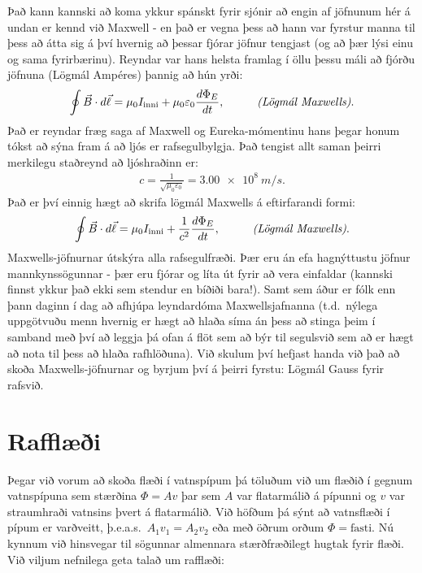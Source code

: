 Það kann kannski að koma ykkur spánskt fyrir sjónir að engin af jöfnunum hér á undan er kennd við Maxwell - en það er vegna þess að hann var fyrstur manna til þess að átta sig á því hvernig að þessar fjórar jöfnur tengjast (og að þær lýsi einu og sama fyrirbærinu). Reyndar var hans helsta framlag í öllu þessu máli að  fjórðu jöfnuna (Lögmál Ampéres) þannig að hún yrði:
\begin{align*}
    \oint \vec{B} \cdot d\vec{\ell} = \mu_0 I_{\text{inni}} + \mu_0 \varepsilon_0 \frac{d\Phi_E}{dt}, \hspace{1cm} \text{\emph{(Lögmál Maxwells)}}.
\end{align*}
Það er reyndar fræg saga af Maxwell og Eureka-mómentinu hans þegar honum tókst að sýna fram á að ljós er rafsegulbylgja. Það tengist allt saman þeirri merkilegu staðreynd að ljóshraðinn er:
\begin{align*}
    c = \frac{1}{\sqrt{\mu_0 \varepsilon_0}} = \SI{3.00e8}{m/s}.
\end{align*}
Það er því einnig hægt að skrifa lögmál Maxwells á eftirfarandi formi:
\begin{align*}
    \oint \vec{B} \cdot d\vec{\ell} = \mu_0 I_{\text{inni}} + \frac{1}{c^2} \frac{d\Phi_E}{dt}, \hspace{1cm} \text{\emph{(Lögmál Maxwells)}}.
\end{align*}
Maxwells-jöfnurnar útskýra alla rafsegulfræði. Þær eru án efa hagnýttustu jöfnur mannkynssögunnar - þær eru fjórar og líta út fyrir að vera einfaldar (kannski finnst ykkur það ekki sem stendur en bíðiði bara!). Samt sem áður er fólk enn þann daginn í dag að afhjúpa leyndardóma Maxwellsjafnanna (t.d.~nýlega uppgötvuðu menn hvernig er hægt að hlaða síma án þess að stinga þeim í samband með því að leggja þá ofan á flöt sem að býr til segulsvið sem að er hægt að nota til þess að hlaða rafhlöðuna). Við skulum því hefjast handa við það að skoða Maxwells-jöfnurnar og byrjum því á þeirri fyrstu: Lögmál Gauss fyrir rafsvið.

\newpage

\section{Rafflæði}

Þegar við vorum að skoða flæði í vatnspípum þá töluðum við um flæðið í gegnum vatnspípuna sem stærðina $\Phi = Av$ þar sem $A$ var flatarmálið á pípunni og $v$ var straumhraði vatnsins þvert á flatarmálið. Við höfðum þá sýnt að vatnsflæði í pípum er varðveitt, þ.e.a.s.~$A_1v_1 = A_2 v_2$ eða með öðrum orðum $\Phi = \text{fasti}$. Nú kynnum við hinsvegar til sögunnar almennara stærðfræðilegt hugtak fyrir flæði. Við viljum nefnilega geta talað um rafflæði:

